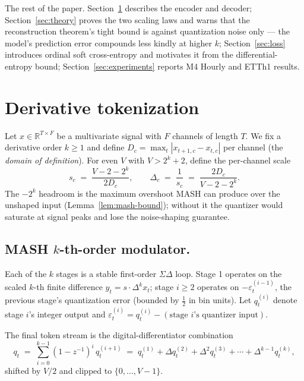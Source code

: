 \documentclass[11pt]{article}
\theoremstyle{remark}
\begin{document}
The rest of the paper. Section~\ref{sec:encoder} describes the encoder
and decoder; Section~\ref{sec:theory} proves the two scaling laws and
warns that the reconstruction theorem's tight bound is against
quantization noise only --- the model's prediction error compounds
less kindly at higher $k$; Section~\ref{sec:loss} introduces ordinal
soft cross-entropy and motivates it from the differential-entropy
bound; Section~\ref{sec:experiments} reports M4 Hourly and ETTh1 results.

\section{Derivative tokenization}
\label{sec:encoder}

Let $x \in \mathbb{R}^{T \times F}$ be a multivariate signal with $F$
channels of length $T$. We fix a derivative order $k \ge 1$ and define
$D_c = \max_{t} |x_{t+1,c} - x_{t,c}|$ per channel (the \emph{domain
of definition}). For even $V$ with $V > 2^k + 2$, define the per-channel
scale
\begin{equation}
s_c \;=\; \frac{V - 2 - 2^k}{2 D_c}, \qquad \Delta_c \;=\; \frac{1}{s_c} \;=\; \frac{2 D_c}{V - 2 - 2^k}.
\end{equation}
The $-2^k$ headroom is the maximum overshoot MASH can produce over
the unshaped input (Lemma~\ref{lem:mash-bound}); without it the
quantizer would saturate at signal peaks and lose the noise-shaping
guarantee.

\subsection{MASH $k$-th-order modulator.}
Each of the $k$ stages is a stable first-order $\Sigma\Delta$ loop.
Stage 1 operates on the scaled $k$-th finite difference $y_t = s \cdot
\Delta^k x_t$; stage $i \ge 2$ operates on $-\varepsilon^{(i-1)}_t$, the
previous stage's quantization error (bounded by $\tfrac{1}{2}$ in bin
units). Let $q^{(i)}_t$ denote stage $i$'s integer output and
$\varepsilon^{(i)}_t = q^{(i)}_t - (\text{stage $i$'s quantizer input})$.

The final token stream is the digital-differentiator combination
\begin{equation}
q_t \;=\; \sum_{i=0}^{k-1} (1 - z^{-1})^i \, q^{(i+1)}_t \;=\;
           q^{(1)}_t + \Delta q^{(2)}_t + \Delta^2 q^{(3)}_t + \cdots
           + \Delta^{k-1} q^{(k)}_t,
\label{eq:mash-combined}
\end{equation}
shifted by $V/2$ and clipped to $\{0, \dots, V-1\}$.
\end{document}
